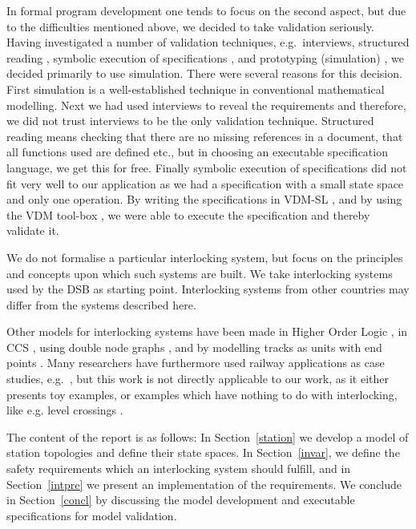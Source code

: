 \documentclass[11pt]{article}
\begin{document}
In formal program development one tends to focus on
the second aspect, but due to the difficulties mentioned above, we decided
to take validation seriously. 
Having
investigated a number of validation techniques, e.g.\ interviews,
structured reading \cite{validate,king}, symbolic execution of
specifications \cite{kneuper}, and prototyping (simulation)
\cite{prototyping}, we decided primarily to use simulation.
There were several reasons for this decision. First simulation is a
well-established technique in conventional mathematical modelling.
Next we had used interviews to reveal the requirements and therefore,
we did not trust interviews to be the only validation technique.
Structured reading means checking that there are no missing
references in a document, that all functions used are defined etc.,
but in choosing an executable specification language, we get this for
free. Finally symbolic execution of specifications did not fit very
well to our application as we had a specification with a small state
space and only one operation. 
By writing the specifications in VDM-SL
\cite{vdmsl}, and by using the VDM tool-box \cite{toolbox}, we were
able to execute the specification and thereby validate it. 

We do not formalise a particular interlocking system, but focus on
the principles and concepts upon which such systems are built. We take
interlocking systems used by the
DSB as starting point. Interlocking systems from other
countries may differ from the systems described here.

Other models
for interlocking systems
have been made in Higher Order Logic \cite{wai,morley3}, in
CCS \cite{morley2}, using double node graphs \cite{markus2,markus1}, and by
modelling tracks as units with end points \cite{sorenprehn}.
Many researchers have furthermore used railway applications as case studies,
e.g.\
\cite{jus,broy}, but this work is not directly applicable to our work, 
as it  either presents toy examples, or examples which have nothing to
do with interlocking, like e.g. level crossings \cite{jus}.

The content of the report is as follows: In Section~\ref{station} we
develop a model of station topologies and define their 
state spaces. In
Section~\ref{invar}, we define the safety requirements which an
interlocking system should fulfill, and in Section~\ref{intpre} we
present an implementation of the requirements. We
conclude in Section~\ref{concl} by
discussing the model development and executable
specifications for model validation. 



\end{document}
